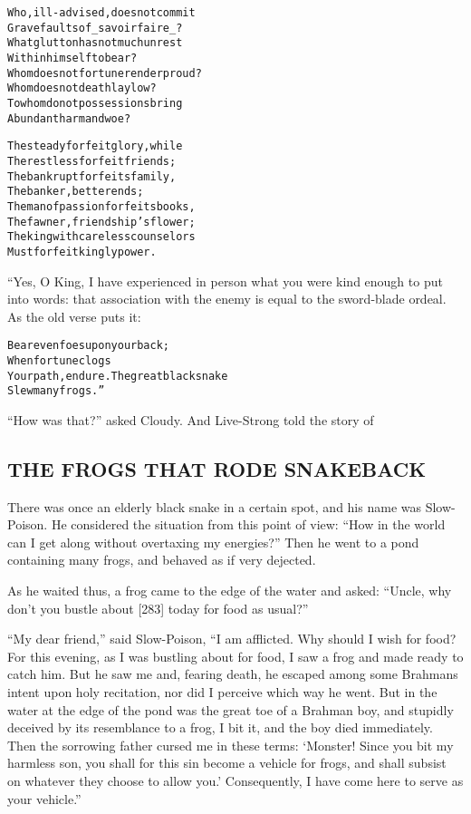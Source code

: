 \documentclass{article}
\renewenvironment{verbatim}{\begin{alltt}\normalfont\begin{centering}}{\end{centering}\end{alltt}}
\begin{document}
\begin{verbatim}
Who, ill-advised, does not commit
    Grave faults of _savoir faire_?
What glutton has not much unrest
    Within himself to bear?
Whom does not fortune render proud?
    Whom does not death lay low?
To whom do not possessions bring
    Abundant harm and woe?

The steady forfeit glory, while
    The restless forfeit friends;
The bankrupt forfeits family,
    The banker, better ends;
The man of passion forfeits books,
    The fawner, friendship's flower;
The king with careless counselors
    Must forfeit kingly power.
\end{verbatim}
“Yes, O King, I have experienced in person what you were kind
enough to put into words: that association with the enemy is equal
to the sword-blade ordeal. As the old verse puts it:

\begin{verbatim}
Bear even foes upon your back;
    When fortune clogs
Your path, endure. The great black snake
    Slew many frogs.”
\end{verbatim}
``How was that?'' asked Cloudy. And Live-Strong told the story of

\subsection{THE FROGS THAT RODE SNAKEBACK}

There was once an elderly black snake in a certain spot, and his
name was Slow-Poison. He considered the situation from this point
of view:
``How in the world can I get along without overtaxing my energies?''
Then he went to a pond containing many frogs, and behaved as if
very dejected.

As he waited thus, a frog came to the edge of the water and asked:
``Uncle, why don't you bustle about [283] today for food as usual?''

``My dear friend,'' said Slow-Poison,
``I am afflicted. Why should I wish for food? For this evening, as I was bustling about for food, I saw a frog and made ready to catch him. But he saw me and, fearing death, he escaped among some Brahmans intent upon holy recitation, nor did I perceive which way he went. But in the water at the edge of the pond was the great toe of a Brahman boy, and stupidly deceived by its resemblance to a frog, I bit it, and the boy died immediately. Then the sorrowing father cursed me in these terms: `Monster! Since you bit my harmless son, you shall for this sin become a vehicle for frogs, and shall subsist on whatever they choose to allow you.' Consequently, I have come here to serve as your vehicle.''
\end{document}
